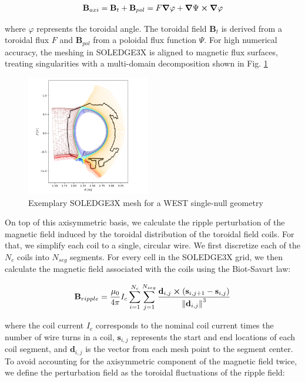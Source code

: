 \begin{equation}
	\textbf{B}_{axi} = \textbf{B}_t + \textbf{B}_{pol} = F\grad{\varphi} + \grad{\Psi}\cross\grad{\varphi} \label{eq:axiSymBfield}
\end{equation}

where $\varphi$ represents the toroidal angle. The toroidal field $\textbf{B}_t$ is derived from a toroidal flux $F$ and $\textbf{B}_{pol}$ from a poloidal flux function $\Psi$. For high numerical accuracy, the meshing in SOLEDGE3X is aligned to magnetic flux surfaces, treating singularities with a multi-domain decomposition shown in Fig. \ref{fig:WESTmesh} \newline 

\begin{figure}[H]\centering
	\centering
	\includegraphics[width=0.48\textwidth]{schemes/WESTmesh.png}
	\caption[Exemplary SOLEDGE3X mesh for a WEST single-null geometry ]{Exemplary SOLEDGE3X mesh for a WEST single-null geometry }
	\label{fig:WESTmesh}
\end{figure}

On top of this axisymmetric basis, we calculate the ripple perturbation of the magnetic field induced by the toroidal distribution of the toroidal field coils. For that, we simplify each coil to a single, circular wire. We first discretize each of the $N_{c}$ coils into $N_{seg}$ segments. For every cell in the SOLEDGE3X grid, we then calculate the magnetic field associated with the coils using the Biot-Savart law:

\begin{equation}
	\textbf{B}_{ripple} = \frac{\mu_0}{4\pi}I_c\sum_{i=1}^{N_{c}}\sum_{j=1}^{N_{seg}}\frac{\textbf{d}_{i,j}\cross\left(\textbf{s}_{i,j+1} - \textbf{s}_{i,j}\right)}{\norm{\textbf{d}_{i,j}}^3}
\end{equation}

where the coil current $I_c$ corresponds to the nominal coil current times the number of wire turns in a coil, $\textbf{s}_{i,j}$ represents the start and end locations of each coil segment, and $\textbf{d}_{i,j}$ is the vector from each mesh point to the segment center. To avoid accounting for the axisymmetric component of the magnetic field twice, we define the perturbation field as the toroidal fluctuations of the ripple field:


